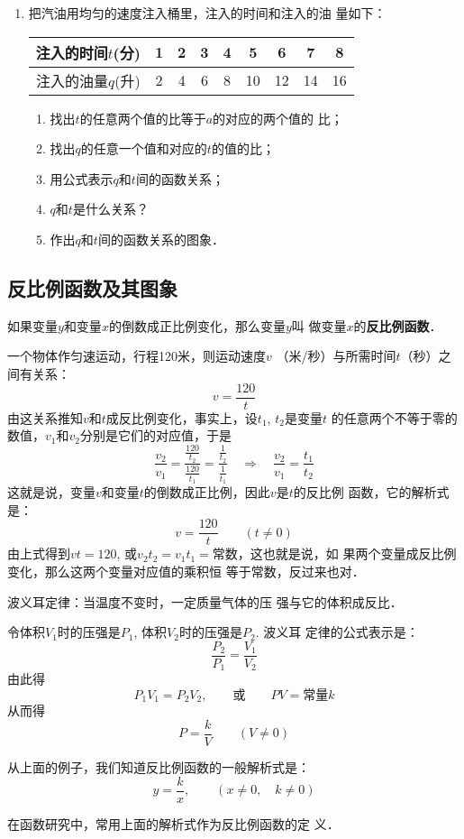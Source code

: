 \begin{enumerate}
\item 把汽油用均匀的速度注入桶里，注入的时间和注入的油
量如下：
\begin{center}
\begin{tabular}{c|cccccccc}
    \hline
    注入的时间$t$(分)&1&2&3&4&5&6&7&8\\
   \hline
注入的油量$q$(升)   &2&4&6&8&10&12&14&16\\
   \hline
\end{tabular}
\end{center}
\begin{enumerate}
    \item 找出$t$的任意两个值的比等于$a$的对应的两个值的
    比；
    \item 找出$q$的任意一个值和对应的$t$的值的比；
    \item 用公式表示$q$和$t$间的函数关系；
    \item $q$和$t$是什么关系？
    \item 作出$q$和$t$间的函数关系的图象．
\end{enumerate}
\end{enumerate}


\subsection{反比例函数及其图象}
如果变量$y$和变量$x$的倒数成正比例变化，那么变量$y$叫
做变量$x$的\textbf{反比例函数}．


\begin{example}
    一个物体作匀速运动，行程120米，则运动速度$v$
（米/秒）与所需时间$t$（秒）之间有关系：
\[v=\frac{120}{t}\]
由这关系推知$v$和$t$成反比例变化，事实上，设$t_1$, $t_2$是变量$t$
的任意两个不等于零的数值，$v_1$和$v_2$分别是它们的对应值，于是
\[\frac{v_2}{v_1}=\frac{\frac{120}{t_2}}{\frac{120}{t_1}}=\frac{\frac{1}{t_2}}{\frac{1}{t_1}}\quad \Rightarrow\quad \frac{v_2}{v_1}=\frac{t_1}{t_2}\]
这就是说，变量$v$和变量$t$的倒数成正比例，因此$v$是$t$的反比例
函数，它的解析式是：
\[v=\frac{120}{t}\qquad (t\ne 0)\]
由上式得到$vt=120$, 或$v_2t_2=v_1t_1=$常数，这也就是说，如
果两个变量成反比例变化，那么这两个变量对应值的乘积恒
等于常数，反过来也对．
\end{example}


\begin{example}
    波义耳定律：当温度不变时，一定质量气体的压
强与它的体积成反比．

令体积$V_1$时的压强是$P_1$, 体积$V_2$时的压强是$P_2$. 波义耳
定律的公式表示是：
\[\frac{P_2}{P_1}=\frac{V_1}{V_2}\]
由此得
\[P_1V_1=P_2V_2,\qquad \text{或}\qquad PV=\text{常量}k\]
从而得
\[P=\frac{k}{V}\qquad (V\ne 0)\]

从上面的例子，我们知道反比例函数的一般解析式是：
\[y=\frac{k}{x},\qquad (x\ne 0,\quad k\ne 0)\]

在函数研究中，常用上面的解析式作为反比例函数的定
义．
\end{example}


